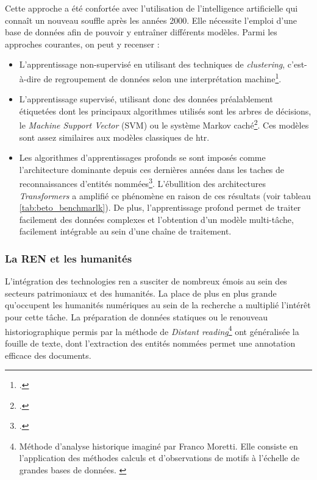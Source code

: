     Cette approche a été confortée avec l'utilisation de l'intelligence artificielle qui connaît un nouveau souffle après les années 2000. Elle nécessite l'emploi d'une base de données afin de pouvoir y entraîner différents modèles. Parmi les approches courantes, on peut y recenser :
    \begin{itemize}
        \item L'apprentissage non-supervisé en utilisant des techniques de \textit{clustering}, c'est-à-dire de regroupement de données selon une interprétation machine\footcite{liSurveyDeepLearning2020}.
        \item L'apprentissage supervisé, utilisant donc des données préalablement étiquetées dont les principaux algorithmes utilisés sont les arbres de décisions, le \textit{Machine Support Vector} (SVM) ou le système Markov caché\footcite{liSurveyDeepLearning2020}. Ces modèles sont assez similaires aux modèles classiques de \gls{htr}.
        \item Les algorithmes d'apprentissages profonds se sont imposés comme l'architecture dominante depuis ces dernières années dans les taches de reconnaissances d'entités nommées\footcite{liSurveyDeepLearning2020}. L'ébullition des architectures \textit{Transformers} a amplifié ce phénomène en raison de ces résultats (voir tableau \ref{tab:beto_benchmarlk}). De plus, l'apprentissage profond permet de traiter facilement des données complexes et l'obtention d'un modèle multi-tâche, facilement intégrable au sein d'une chaîne de traitement.
    \end{itemize}
    
    \subsubsection{La REN et les humanités}
    
    L'intégration des technologies \gls{ren} a susciter de nombreux émois au sein des secteurs patrimoniaux et des humanités. La place de plus en plus grande qu'occupent les humanités numériques au sein de la recherche a multiplié l'intérêt pour cette tâche. La préparation de données statiques ou le renouveau historiographique permis par la méthode de \textit{Distant reading}\footnote{Méthode d'analyse historique imaginé par Franco Moretti. Elle consiste en l'application des méthodes calculs et d'observations de motifs à l'échelle de grandes bases de données. \cite{purenLectureDistanteIntroduction2020a}} ont généralisée la fouille de texte, dont l'extraction des entités nommées permet une annotation efficace des documents.
    
